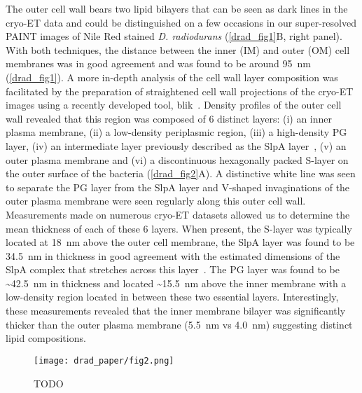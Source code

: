 The outer cell wall bears two lipid bilayers that can be seen as dark lines in the cryo-ET data and could be distinguished on a few occasions in our super-resolved PAINT images of Nile Red stained \textit{D. radiodurans} (\autoref{drad_fig1}B, right panel).
With both techniques, the distance between the inner (IM) and outer (OM) cell membranes was in good agreement and was found to be around \qty{95}{nm} (\autoref{drad_fig1}).
A more in-depth analysis of the cell wall layer composition was facilitated by the preparation of straightened cell wall projections of the cryo-ET images using a recently developed tool, blik~\cite{gaifasBlikExtensible3D2024}.
Density profiles of the outer cell wall revealed that this region was composed of 6 distinct layers: (i) an inner plasma membrane, (ii) a low-density periplasmic region, (iii) a high-density PG layer, (iv) an intermediate layer previously described as the SlpA layer~\cite{vonkugelgenMultidomainConnectorLinks2022}, (v) an outer plasma membrane and (vi) a discontinuous hexagonally packed S-layer on the outer surface of the bacteria (\autoref{drad_fig2}A).
A distinctive white line was seen to separate the PG layer from the SlpA layer and V-shaped invaginations of the outer plasma membrane were seen regularly along this outer cell wall.
Measurements made on numerous cryo-ET datasets allowed us to determine the mean thickness of each of these 6 layers.
When present, the S-layer was typically located at \qty{18}{nm} above the outer cell membrane, the SlpA layer was found to be \qty{34.5}{nm} in thickness in good agreement with the estimated dimensions of the SlpA complex that stretches across this layer~\cite{vonkugelgenMultidomainConnectorLinks2022}.
The PG layer was found to be \sim\qty{42.5}{nm} in thickness and located \sim\qty{15.5}{nm} above the inner membrane with a low-density region located in between these two essential layers.
Interestingly, these measurements revealed that the inner membrane bilayer was significantly thicker than the outer plasma membrane (\qty{5.5}{nm} vs \qty{4.0}{nm}) suggesting distinct lipid compositions.

\begin{figure}[ht]
    \centering
    \texttt{[image: drad\_paper/fig2.png]}
    \caption{TODO}
    \label{drad_fig2}
\end{figure}


